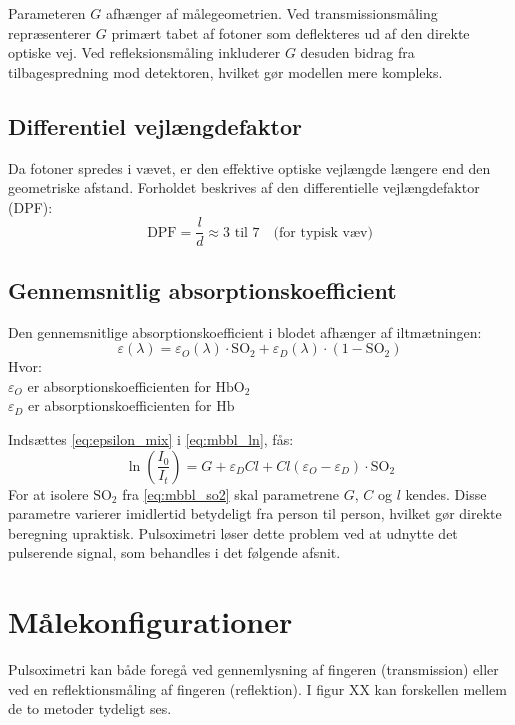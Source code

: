 Parameteren $G$ afhænger af målegeometrien. Ved transmissionsmåling repræsenterer $G$ primært tabet af fotoner som deflekteres ud af den direkte optiske vej. Ved refleksionsmåling inkluderer $G$ desuden bidrag fra tilbagespredning mod detektoren, hvilket gør modellen mere kompleks.

\subsection{Differentiel vejlængdefaktor}

Da fotoner spredes i vævet, er den effektive optiske vejlængde længere end den geometriske afstand. Forholdet beskrives af den differentielle vejlængdefaktor (DPF):
\begin{equation}
    \text{DPF} = \frac{l}{d} \approx 3 \text{ til } 7 \quad \text{(for typisk væv)}
    \label{eq:dpf}
\end{equation}

\subsection{Gennemsnitlig absorptionskoefficient}
Den gennemsnitlige absorptionskoefficient i blodet afhænger af iltmætningen:
\begin{equation}
    \varepsilon(\lambda) = \varepsilon_O(\lambda) \cdot \text{SO}_2 + \varepsilon_D(\lambda) \cdot (1 - \text{SO}_2)
    \label{eq:epsilon_mix}
\end{equation}
Hvor: \\ 
$\varepsilon_O$ er absorptionskoefficienten for $\text{HbO}_2$ \\
$\varepsilon_D$ er absorptionskoefficienten for $\text{Hb}$

Indsættes \cref{eq:epsilon_mix} i \cref{eq:mbbl_ln}, fås:
\begin{equation}
    \ln\!\left(\frac{I_0}{I_t}\right) = G + \varepsilon_D C l + C l (\varepsilon_O - \varepsilon_D) \cdot \text{SO}_2
    \label{eq:mbbl_so2}
\end{equation}
For at isolere $\text{SO}_2$ fra \cref{eq:mbbl_so2} skal parametrene $G$, $C$ og $l$ kendes. Disse parametre varierer imidlertid betydeligt fra person til person, hvilket gør direkte beregning upraktisk. Pulsoximetri løser dette problem ved at udnytte det pulserende signal, som behandles i det følgende afsnit.

\section{Målekonfigurationer}
\label{sec:målekonfigurationer}
Pulsoximetri kan både foregå ved gennemlysning af fingeren (transmission) eller ved en reflektionsmåling af fingeren (reflektion). I figur XX kan forskellen mellem de to metoder tydeligt ses.


